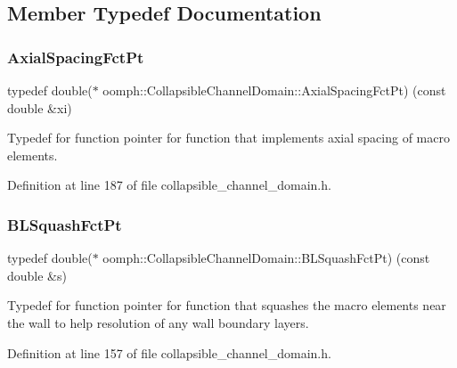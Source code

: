 \subsection{Member Typedef Documentation}
\mbox{\label{classoomph_1_1CollapsibleChannelDomain_a317472dab112beac771ecf6442a465f5}} 
\subsubsection{\texorpdfstring{Axial\+Spacing\+Fct\+Pt}{AxialSpacingFctPt}}
{\footnotesize\ttfamily typedef double($\ast$ oomph\+::\+Collapsible\+Channel\+Domain\+::\+Axial\+Spacing\+Fct\+Pt) (const double \&xi)}



Typedef for function pointer for function that implements axial spacing of macro elements. 



Definition at line 187 of file collapsible\+\_\+channel\+\_\+domain.\+h.

\mbox{\label{classoomph_1_1CollapsibleChannelDomain_a2bf1d7943bfac134a5c27a54c7e1faed}} 
\subsubsection{\texorpdfstring{B\+L\+Squash\+Fct\+Pt}{BLSquashFctPt}}
{\footnotesize\ttfamily typedef double($\ast$ oomph\+::\+Collapsible\+Channel\+Domain\+::\+B\+L\+Squash\+Fct\+Pt) (const double \&s)}



Typedef for function pointer for function that squashes the macro elements near the wall to help resolution of any wall boundary layers. 



Definition at line 157 of file collapsible\+\_\+channel\+\_\+domain.\+h.



